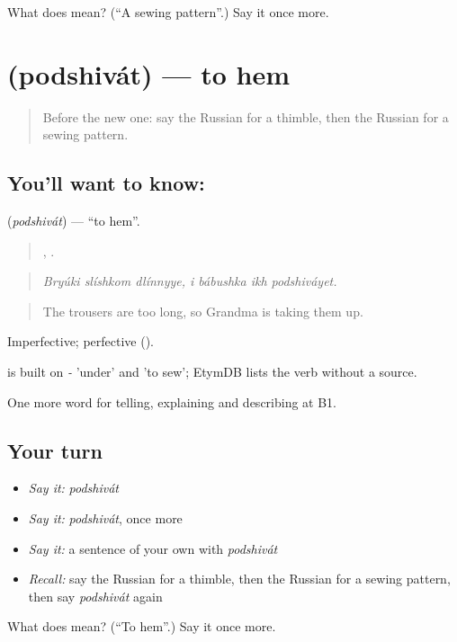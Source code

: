 \begin{tcolorbox}[breakable,colback=teal!4,colframe=teal!35!black,title={Before you move on}]
What does  mean? (\textquotedblleft{}A sewing pattern\textquotedblright{}.) Say it once more.
\end{tcolorbox}
\section[\texorpdfstring{\ru{подшивать} (podshivát)}{подшивать (podshivát)}]{ (podshivát) — to hem}

\label{lesson:RU-C501-podshivat}



\begin{quote}
Before the new one: say the Russian for a thimble, then the Russian for a sewing pattern.
\end{quote}

\subsection*{You'll want to know: }
\textbf{} (\emph{podshivát}) — \textquotedblleft{}to hem\textquotedblright{}.

\begin{quote}
  ,    .
\end{quote}

\begin{quote}
\emph{Bryúki slíshkom dlínnyye, i bábushka ikh podshiváyet.}
\end{quote}

\begin{quote}
The trousers are too long, so Grandma is taking them up.
\end{quote}

Imperfective; perfective  ().

\begin{cousinweb}
\emph{} is built on \emph{-} 'under' and \emph{} 'to sew'; EtymDB lists the verb without a source.
\end{cousinweb}

\begin{grammarlens}[title={What you've built}]
One more word for telling, explaining and describing at B1.
\end{grammarlens}

\subsection*{Your turn}
\begin{itemize}
\raggedright
  \item \emph{Say it:} \emph{podshivát}
  \item \emph{Say it:} \emph{podshivát}, once more
  \item \emph{Say it:} a sentence of your own with \emph{podshivát}
  \item \emph{Recall:} say the Russian for a thimble, then the Russian for a sewing pattern, then say \emph{podshivát} again
\end{itemize}

\begin{tcolorbox}[breakable,colback=teal!4,colframe=teal!35!black,title={Before you move on}]
What does  mean? (\textquotedblleft{}To hem\textquotedblright{}.) Say it once more.
\end{tcolorbox}
